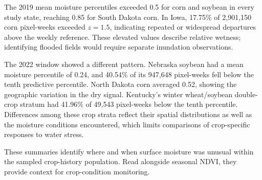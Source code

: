 The 2019 mean moisture percentiles exceeded 0.5 for corn and soybean in
every study state, reaching 0.85 for South Dakota corn. In Iowa, 17.75\% of
2,901,150 corn pixel-weeks exceeded $z=1.5$, indicating repeated or
widespread departures above the weekly reference. These elevated values
describe relative wetness; identifying flooded fields would require
separate inundation observations.

The 2022 window showed a different pattern. Nebraska soybean had a mean
moisture percentile of 0.24, and 40.54\% of its 947,648 pixel-weeks fell
below the tenth predictive percentile. North Dakota corn averaged 0.52,
showing the geographic variation in the dry signal. Kentucky's winter
wheat/soybean double-crop stratum had 41.96\% of 49,543 pixel-weeks below
the tenth percentile.
Differences among these crop strata reflect their spatial distributions
as well as the moisture conditions encountered, which limits comparisons
of crop-specific responses to water stress.

These summaries identify where and when surface moisture was unusual
within the sampled crop-history population. Read alongside seasonal NDVI,
they provide context for crop-condition monitoring.

